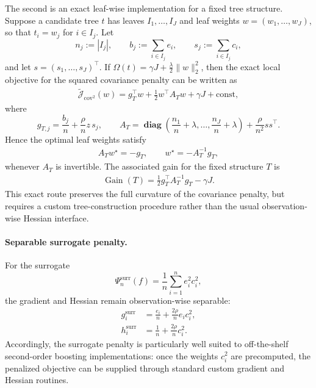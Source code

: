 \documentclass[12pt, draft]{article}
\theoremstyle{plain}
\theoremstyle{definition}
\newcommand{\1}{\mathbf{1}}
\newcommand{\diag}{\mathbf{\operatorname{diag}}}
\begin{document}
The second is an exact leaf-wise implementation for a fixed tree structure. Suppose a candidate tree \(t\) has leaves \(I_1,\dots,I_J\) and leaf weights \(w=(w_1,\dots,w_J)\), so that \(t_i=w_j\) for \(i\in I_j\). Let
\[
n_j := |I_j|,
\qquad
b_j := \sum_{i\in I_j} e_i,
\qquad
s_j := \sum_{i\in I_j} c_i,
\]
and let \(s=(s_1,\dots,s_J)^\top\). If \(\Omega(t)=\gamma J + \frac{\lambda}{2}\|w\|_2^2\), then the exact local objective for the squared covariance penalty can be written as
\begin{align}
    \label{eq:boosting_cov2_exact_leaf_objective}
    \widetilde{\mathcal J}_{\mathrm{cov}^2}(w)
    =
    g_T^\top w
    +
    \frac{1}{2}w^\top A_T w
    +
    \gamma J
    + \text{const},
\end{align}
where
\[
g_{T,j}
=
\frac{b_j}{n}
+
\frac{\rho}{n}z\,s_j,
\qquad
A_T
=
\diag\!\left(\frac{n_1}{n}+\lambda,\dots,\frac{n_J}{n}+\lambda\right)
+
\frac{\rho}{n^2}ss^\top.
\]
Hence the optimal leaf weights satisfy
\begin{align}
    \label{eq:boosting_cov2_exact_leaf_system}
    A_T w^\star = -g_T,
    \qquad
    w^\star = -A_T^{-1}g_T,
\end{align}
whenever \(A_T\) is invertible. The associated gain for the fixed structure \(T\) is
\begin{align}
    \label{eq:boosting_cov2_exact_gain}
    \operatorname{Gain}(T)
    =
    \frac{1}{2}g_T^\top A_T^{-1}g_T - \gamma J.
\end{align}
This exact route preserves the full curvature of the covariance penalty, but requires a custom tree-construction procedure rather than the usual observation-wise Hessian interface.

\paragraph{Separable surrogate penalty.}
For the surrogate
\[
\Psi_n^{\mathrm{surr}}(f)
=
\frac{1}{n}\sum_{i=1}^n e_i^2 c_i^2,
\]
the gradient and Hessian remain observation-wise separable:
\begin{align}
    \label{eq:boosting_surr_grad_hess}
    g_i^{\mathrm{surr}}
    &=
    \frac{e_i}{n}
    +
    \frac{2\rho}{n}e_i c_i^2,
    \\
    h_i^{\mathrm{surr}}
    &=
    \frac{1}{n}
    +
    \frac{2\rho}{n}c_i^2.
\end{align}
Accordingly, the surrogate penalty is particularly well suited to off-the-shelf second-order boosting implementations: once the weights \(c_i^2\) are precomputed, the penalized objective can be supplied through standard custom gradient and Hessian routines.
\end{document}
